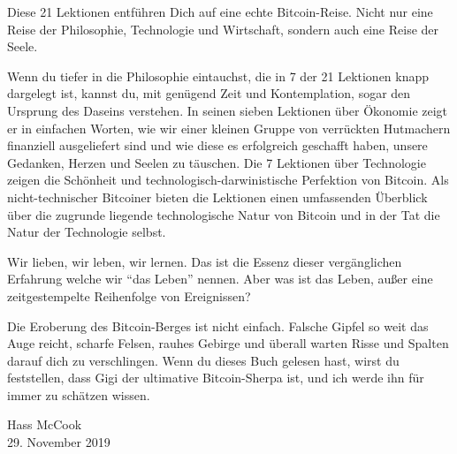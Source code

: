 Diese 21 Lektionen entführen Dich auf eine echte Bitcoin-Reise. Nicht nur eine
Reise der Philosophie, Technologie und Wirtschaft, sondern auch eine Reise der
Seele.

Wenn du tiefer in die Philosophie eintauchst, die in 7 der 21 Lektionen knapp
dargelegt ist, kannst du, mit genügend Zeit und Kontemplation, sogar den
Ursprung des Daseins verstehen. In seinen sieben Lektionen über Ökonomie zeigt
er in einfachen Worten, wie wir einer kleinen Gruppe von verrückten Hutmachern
finanziell ausgeliefert sind und wie diese es erfolgreich geschafft haben,
unsere Gedanken, Herzen und Seelen zu täuschen. Die 7 Lektionen über Technologie
zeigen die Schönheit und technologisch-darwinistische Perfektion von Bitcoin.
Als nicht-technischer Bitcoiner bieten die Lektionen einen umfassenden Überblick
über die zugrunde liegende technologische Natur von Bitcoin und in der Tat die
Natur der Technologie selbst.

Wir lieben, wir leben, wir lernen. Das ist die Essenz dieser vergänglichen
Erfahrung welche wir \enquote{das Leben} nennen. Aber was ist das Leben, außer
eine zeitgestempelte Reihenfolge von Ereignissen?

Die Eroberung des Bitcoin-Berges ist nicht einfach. Falsche Gipfel so weit das
Auge reicht, scharfe Felsen, rauhes Gebirge und überall warten Risse und Spalten
darauf dich zu verschlingen. Wenn du dieses Buch gelesen hast, wirst du
feststellen, dass Gigi der ultimative Bitcoin-Sherpa ist, und ich werde ihn für
immer zu schätzen wissen.

\begin{flushright}
  Hass McCook \\
  29. November 2019
\end{flushright}
